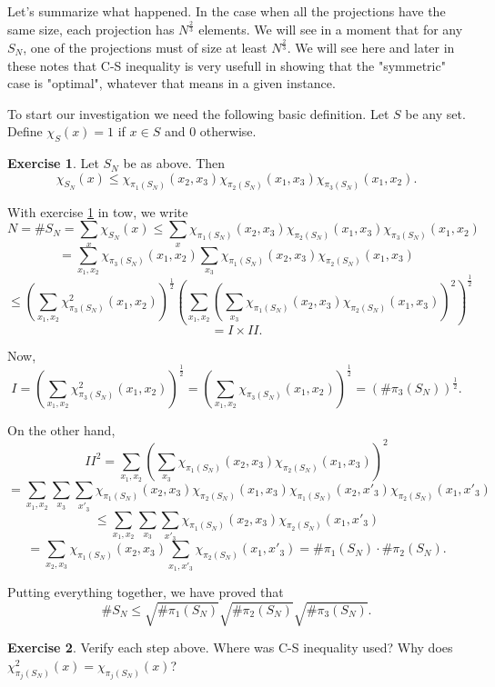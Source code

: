 \documentclass[]{amsart}
\numberwithin{equation}{section}
\theoremstyle{plain}
\theoremstyle{definition}
\newtheorem{exercise}{Exercise}[section]
\theoremstyle{remark}
\begin{document}
Let's summarize what happened. In the case when all the projections have
the same size, each projection has $N^{\frac{2}{3}}$ elements. We will
see in a moment that for any $S_N$, one of the projections must of size
at least $N^{\frac{2}{3}}$. We will see here and later in these notes
that C-S inequality is very usefull in showing that the "symmetric" case
is "optimal", whatever that means in a given instance.

To start our investigation we need the following basic definition. Let
$S$ be any set. Define $\chi_S(x)=1$ if $x \in S$ and $0$ otherwise.

\begin{exercise} \label{box.ex}
Let $S_N$ be as above. Then
$$\chi_{S_N}(x) \leq
\chi_{\pi_1(S_N)}(x_2,x_3)\chi_{\pi_2(S_N)}(x_1,x_3)
\chi_{\pi_3(S_N)}(x_1,x_2).$$
\end{exercise}

With exercise \ref{box.ex} in tow, we write
$$ N=\# S_N=\sum_{x} \chi_{S_N}(x) \leq
\sum_{x} \chi_{\pi_1(S_N)}(x_2,x_3)\chi_{\pi_2(S_N)}(x_1,x_3)
\chi_{\pi_3(S_N)}(x_1,x_2)$$
$$=\sum_{x_1,x_2} \chi_{\pi_3(S_N)}(x_1,x_2)
\sum_{x_3} \chi_{\pi_1(S_N)}(x_2,x_3)\chi_{\pi_2(S_N)}(x_1,x_3)$$
$$ \leq {\left(\sum_{x_1,x_2}
\chi^2_{\pi_3(S_N)}(x_1,x_2)\right)}^{\frac{1}{2}}
{\left(\sum_{x_1,x_2} {\left(\sum_{x_3}
\chi_{\pi_1(S_N)}(x_2,x_3)\chi_{\pi_2(S_N)}(x_1,x_3)\right)}^2
\right)}^{\frac{1}{2}}$$
$$=I \times II. $$

Now,
$$ I={\left(\sum_{x_1,x_2}
\chi^2_{\pi_3(S_N)}(x_1,x_2)\right)}^{\frac{1}{2}}={\left(\sum_{x_1,x_2}
\chi_{\pi_3(S_N)}(x_1,x_2)\right)}^{\frac{1}{2}}={(\#
\pi_3(S_N))}^{\frac{1}{2}}. $$

On the other hand,
$$ {II}^2=\sum_{x_1,x_2} {\left(\sum_{x_3}
\chi_{\pi_1(S_N)}(x_2,x_3)\chi_{\pi_2(S_N)}(x_1,x_3)\right)}^2$$
$$=\sum_{x_1,x_2} \sum_{x_3} \sum_{x'_3}
\chi_{\pi_1(S_N)}(x_2,x_3)\chi_{\pi_2(S_N)}(x_1,x_3)
\chi_{\pi_1(S_N)}(x_2,x'_3)\chi_{\pi_2(S_N)}(x_1,x'_3)$$
$$ \leq \sum_{x_1,x_2} \sum_{x_3} \sum_{x'_3}
\chi_{\pi_1(S_N)}(x_2,x_3)\chi_{\pi_2(S_N)}(x_1,x'_3)$$
$$=\sum_{x_2,x_3}\chi_{\pi_1(S_N)}(x_2,x_3)
\sum_{x_1,x'_3}\chi_{\pi_2(S_N)}(x_1,x'_3)=\# \pi_1(S_N) \cdot \#
\pi_2(S_N). $$

Putting everything together, we have proved that
\begin{equation} \label{boxineq} \# S_N \leq \sqrt{\# \pi_1(S_N)}\sqrt{\# \pi_2(S_N)}\sqrt{\#
\pi_3(S_N)}. \end{equation}

\begin{exercise} Verify each step above. Where was C-S inequality
used? Why does $\chi^2_{\pi_j(S_N)}(x)=\chi_{\pi_j(S_N)}(x)$? \end{exercise}
\end{document}
